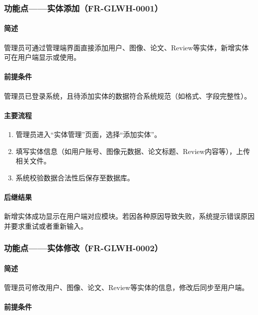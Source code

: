 {\color{gray}
\subsubsection{功能点——实体添加（FR-GLWH-0001）}

\paragraph*{简述}

管理员可通过管理端界面直接添加用户、图像、论文、Review等实体，新增实体可在用户端显示或使用。

\paragraph*{前提条件}

管理员已登录系统，且待添加实体的数据符合系统规范（如格式、字段完整性）。

\paragraph*{主要流程}

\begin{enumerate}
    \item 管理员进入“实体管理”页面，选择“添加实体”。
    \item 填写实体信息（如用户账号、图像元数据、论文标题、Review内容等），上传相关文件。
    \item 系统校验数据合法性后保存至数据库。
\end{enumerate}

\paragraph*{后继结果}

新增实体成功显示在用户端对应模块。若因各种原因导致失败，系统提示错误原因并要求重试或者重新输入。

\subsubsection{功能点——实体修改（FR-GLWH-0002）}

\paragraph*{简述}

管理员可修改用户、图像、论文、Review等实体的信息，修改后同步至用户端。

\paragraph*{前提条件}

}
